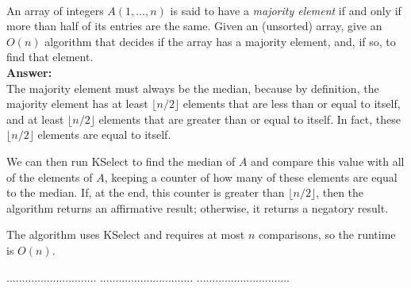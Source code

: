 \documentclass[a4paper,11pt]{article}
\begin{document}
\bigskip
{}\\
An array of integers $A(1, \ldots , n)$ is said to have a {\em majority element} if and only if 
more than half of its entries are the same. 
Given an (unsorted) array, give an $O(n)$ algorithm that decides if the array has a majority element,
and, if so, to find that element. \\
{\bf Answer:}\\
The majority element must always be the median, because by definition, the majority element has at least $\lfloor n/2 \rfloor$ elements that are less than or equal to itself, and at least $\lfloor n/2 \rfloor$ elements that are greater than or equal to itself. In fact, these $\lfloor n/2 \rfloor$ elements are equal to itself. \par
We can then run KSelect to find the median of $A$ and compare this value with all of the elements of $A$, keeping a counter of how many of these elements are equal to the median. If, at the end, this counter is greater than $\lfloor n/2 \rfloor$, then the algorithm returns an affirmative result; otherwise, it returns a negatory result. \par
The algorithm uses KSelect and requires at most $n$ comparisons, so the runtime is $O(n)$.

\pagebreak
{} $.............................$
 $..............................$
          $..............................$\\
\end{document}
